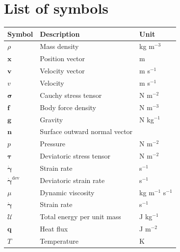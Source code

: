 \chapter*{List of symbols}
\begin{center}
\begin{tabular}{p{2cm}p{6cm}p{3cm}}
Symbol                          & Description                      & Unit \\
\hline\hline
$\rho$                          & Mass density                     & kg m$^{-3}$ \\
$\boldsymbol{x}$                & Position vector                  & m \\
$\boldsymbol{v}$                & Velocity vector                  & m s$^{-1}$ \\
$v$                             & Velocity                         & m s$^{-1}$ \\
$\boldsymbol{\sigma}$           & Cauchy stress tensor             & N m$^{-2}$ \\
$\boldsymbol{f}$                & Body force density               & N m$^{-3}$ \\
$\boldsymbol{g}$                & Gravity                          & N kg$^{-1}$ \\
$\boldsymbol{n}$                & Surface outward normal vector    & \\
$p$                             & Pressure                         & N m$^{-2}$ \\
$\boldsymbol{\tau}$             & Deviatoric stress tensor         & N m$^{-2}$ \\
$\dot{\boldsymbol{\gamma}}$     & Strain rate                      & s$^{-1}$ \\
$\dot{\boldsymbol{\gamma}}^{\mathrm{dev}}$ & Deviatoric strain rate & s$^{-1}$ \\
$\mu$                           & Dynamic viscosity                & kg m$^{-1}$ s$^{-1}$ \\
$\dot{\boldsymbol{\gamma}}$     & Strain rate                      & s$^{-1}$ \\
$\mathcal{U}$                   & Total energy per unit mass       & J kg$^{-1}$ \\
$\boldsymbol{q}$                & Heat flux                        & J m$^{-2}$ \\
$T$                             & Temperature                      & K \\

\end{tabular}
\end{center}
